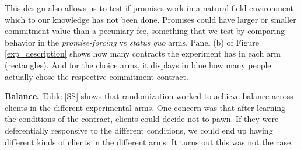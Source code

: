 \documentclass[oneside,11pt]{article}
\begin{document}
This design also allows us to test if promises work in a natural field environment which to our knowledge has not been done. Promises could have larger or smaller commitment value than a pecuniary fee, something that we test by comparing behavior in the \textit{promise-forcing} vs \textit{status quo} arms. Panel (b) of Figure \ref{exp_description} shows how many contracts the experiment has in each arm (rectangles). And for the choice arms, it displays in blue how many people actually chose the respective commitment contract.





    
\vspace{.2in}
\noindent \textbf{Balance.} Table \ref{SS} shows that randomization worked to achieve balance across clients in the different experimental arms. One concern was that after learning the conditions of the contract, clients could decide not to pawn. If they were deferentially responsive to the different conditions, we could end up having different kinds of clients in the different arms. It turns out this was not the case.
\end{document}
